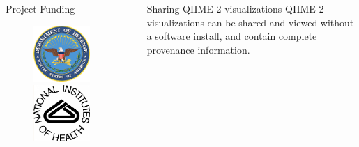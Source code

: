 \documentclass[final]{beamer}
\newlength{\sepwidth}
\newlength{\colwidth}
\newcommand{\separatorcolumn}{\begin{column}{\sepwidth}\end{column}}
\begin{document}
\begin{frame}[t]
\begin{columns}[t]
\begin{column}{\colwidth}
\begin{block}{Project Funding}
\begin{figure}[!htb]
    \endminipage\hfill
      \includegraphics[width=.71\linewidth]{assets/SponsorLogos/DoD}
    \endminipage
      \includegraphics[width=.7\linewidth]{assets/SponsorLogos/NIH}
    \endminipage
  \end{figure}
  \end{block}
\end{column}

\separatorcolumn

\begin{column}{\colwidth}

    \begin{block}{Sharing QIIME 2 visualizations}
      QIIME 2 visualizations can be shared and viewed without a software
      install, and contain complete provenance information.


\end{block}
\end{column}
\end{columns}
\end{frame}
\end{document}
